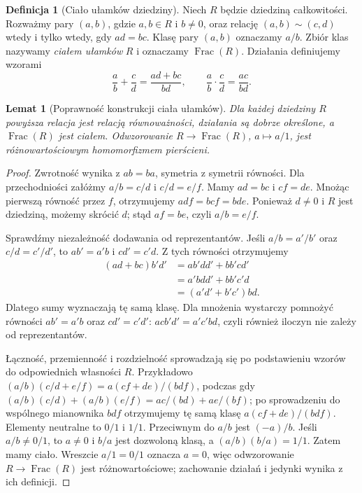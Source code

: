 \documentclass[11pt,a4paper,openany]{report}
\numberwithin{equation}{section}
\theoremstyle{plain}
\newtheorem{lemat}[twierdzenie]{Lemat}
\theoremstyle{definition}
\newtheorem{definicja}[twierdzenie]{Definicja}
\theoremstyle{remark}
\newcommand{\Frac}{\operatorname{Frac}}
\begin{document}
\begin{definicja}[Ciało ułamków dziedziny]
Niech $R$ będzie dziedziną całkowitości.
Rozważmy pary $(a,b)$, gdzie $a,b\in R$ i $b\ne0$,
oraz relację $(a,b)\sim(c,d)$ wtedy i tylko wtedy,
gdy $ad=bc$. Klasę pary $(a,b)$ oznaczamy $a/b$.
Zbiór klas nazywamy \emph{ciałem ułamków} $R$
i oznaczamy $\Frac(R)$. Działania definiujemy wzorami
\[
\frac ab+\frac cd=\frac{ad+bc}{bd},\qquad
\frac ab\cdot\frac cd=\frac{ac}{bd}.
\]
\end{definicja}

\begin{lemat}[Poprawność konstrukcji ciała ułamków]
\label{lem:frac-construction}
Dla każdej dziedziny $R$ powyższa relacja jest relacją
równoważności, działania są dobrze określone, a $\Frac(R)$
jest ciałem. Odwzorowanie $R\to\Frac(R)$,
$a\mapsto a/1$, jest różnowartościowym homomorfizmem pierścieni.
\end{lemat}
\begin{proof}
Zwrotność wynika z $ab=ba$, symetria z symetrii równości.
Dla przechodniości załóżmy $a/b=c/d$ i $c/d=e/f$.
Mamy $ad=bc$ i $cf=de$. Mnożąc pierwszą równość przez
$f$, otrzymujemy $adf=bcf=bde$. Ponieważ $d\ne0$
i $R$ jest dziedziną, możemy skrócić $d$; stąd $af=be$,
czyli $a/b=e/f$.

Sprawdźmy niezależność dodawania od reprezentantów.
Jeśli $a/b=a'/b'$ oraz $c/d=c'/d'$, to
$ab'=a'b$ i $cd'=c'd$. Z tych równości otrzymujemy
\begin{align*}
(ad+bc)b'd'
 &=ab'dd'+bb'cd'\\
 &=a'bdd'+bb'c'd\\
 &=(a'd'+b'c')bd.
\end{align*}
Dlatego sumy wyznaczają tę samą klasę. Dla mnożenia
wystarczy pomnożyć równości $ab'=a'b$ oraz $cd'=c'd'$:
$acb'd'=a'c'bd$, czyli również iloczyn nie zależy od
reprezentantów.

Łączność, przemienność i rozdzielność sprowadzają się
po podstawieniu wzorów do odpowiednich własności $R$.
Przykładowo $(a/b)(c/d+e/f)=a(cf+de)/(bdf)$,
podczas gdy $(a/b)(c/d)+(a/b)(e/f)=ac/(bd)+ae/(bf)$;
po sprowadzeniu do wspólnego mianownika $bdf$ otrzymujemy
tę samą klasę $a(cf+de)/(bdf)$.
Elementy neutralne to $0/1$ i $1/1$.
Przeciwnym do $a/b$ jest $(-a)/b$.
Jeśli $a/b\ne0/1$, to $a\ne0$ i $b/a$ jest dozwoloną klasą,
a $(a/b)(b/a)=1/1$. Zatem mamy ciało.
Wreszcie $a/1=0/1$ oznacza $a=0$, więc odwzorowanie
$R\to\Frac(R)$ jest różnowartościowe; zachowanie działań
i jedynki wynika z ich definicji.
\end{proof}
\end{document}
